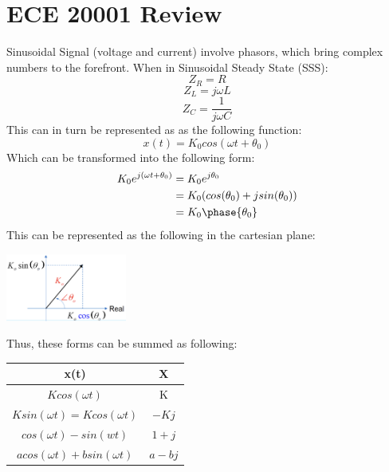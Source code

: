 \documentclass[nobib]{tufte-handout}
\begin{document}
\section{ECE 20001 Review}
Sinusoidal Signal (voltage and current) involve phasors, which bring complex numbers to the forefront. When in Sinusoidal Steady State (SSS):\\
\begin{equation*}
    Z_R=R
\end{equation*}
\begin{equation*}
    Z_L=j\omega L
\end{equation*}
\begin{equation*}
    Z_C=\frac{1}{j\omega C}
\end{equation*}
This can in turn be represented as as the following function:\\
\begin{equation*}
    x(t)=K_0 cos(\omega t + \theta_0)
\end{equation*}
Which can be transformed into the following form:\\
\begin{align*}
    K_0 e^{j(\omega t + \theta_0)} &= K_0 e^{j \theta_0}\\ 
    &= K_0 (cos(\theta_0) + j sin(\theta_0))\\ 
    &= K_0\phase{\theta_0}
\end{align*}
This can be represented as the following in the cartesian plane:\\
\begin{center}
    \includegraphics[width = 150px]{images/Screenshot 2024-01-08 155954.png}
\end{center}
Thus, these forms can be summed as following:\\
\begin{table}
 \centering
    \begin{tabular}{c|c}
    x(t) & $\mathbf{X}$\\
    \hline
    $K cos(\omega t)$ & K\\
    $K sin(\omega t) = K cos(\omega t)$ & $-Kj$\\
    $cos(\omega t) - sin(wt)$ & $1+j$\\
    $a cos(\omega t) + b sin(\omega t)$ & $a-bj$
    \end{tabular}
\end{table}
\end{document}
